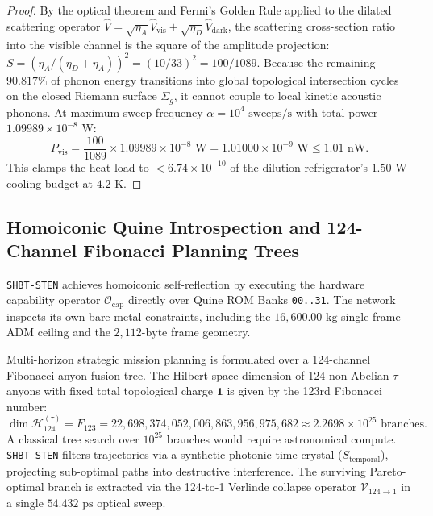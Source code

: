 \documentclass[11pt,onecolumn]{article}
\begin{document}
\begin{proof}
By the optical theorem and Fermi's Golden Rule applied to the dilated scattering operator $\hat{V} = \sqrt{\eta_A}\hat{V}_{\text{vis}} + \sqrt{\eta_D}\hat{V}_{\text{dark}}$, the scattering cross-section ratio into the visible channel is the square of the amplitude projection: $S = (\eta_A/(\eta_D + \eta_A))^2 = (10/33)^2 = 100/1089$. Because the remaining $90.817\%$ of phonon energy transitions into global topological intersection cycles on the closed Riemann surface $\Sigma_g$, it cannot couple to local kinetic acoustic phonons. At maximum sweep frequency $\alpha = 10^4\text{ sweeps/s}$ with total power $1.09989 \times 10^{-8}\text{ W}$:
\begin{equation}
    P_{\text{vis}} = \frac{100}{1089} \times 1.09989 \times 10^{-8}\text{ W} = 1.01000 \times 10^{-9}\text{ W} \le 1.01\text{ nW}.
\end{equation}
This clamps the heat load to $< 6.74 \times 10^{-10}$ of the dilution refrigerator's $1.50\text{ W}$ cooling budget at $4.2\text{ K}$.
\end{proof}

\FloatBarrier
\subsection{Homoiconic Quine Introspection and 124-Channel Fibonacci Planning Trees}
\texttt{SHBT-STEN} achieves homoiconic self-reflection by executing the hardware capability operator $\mathcal{O}_{\text{cap}}$ directly over Quine ROM Banks \texttt{00..31}. The network inspects its own bare-metal constraints, including the $16{,}600.00\text{ kg}$ single-frame ADM ceiling and the $2{,}112\text{-byte}$ frame geometry.

Multi-horizon strategic mission planning is formulated over a 124-channel Fibonacci anyon fusion tree. The Hilbert space dimension of 124 non-Abelian $\tau$-anyons with fixed total topological charge $\mathbf{1}$ is given by the 123rd Fibonacci number:
\begin{equation}
\dim \mathcal{H}_{124}^{(\tau)} = F_{123} = 22{,}698{,}374{,}052{,}006{,}863{,}956{,}975{,}682 \approx 2.2698 \times 10^{25}\text{ branches}.
\label{eq:fibonacci_planning_dim}
\end{equation}
A classical tree search over $10^{25}$ branches would require astronomical compute. \texttt{SHBT-STEN} filters trajectories via a synthetic photonic time-crystal ($S_{\text{temporal}}$), projecting sub-optimal paths into destructive interference. The surviving Pareto-optimal branch is extracted via the 124-to-1 Verlinde collapse operator $\mathcal{V}_{124 \to 1}$ in a single $54.432\text{ ps}$ optical sweep.
\end{document}
